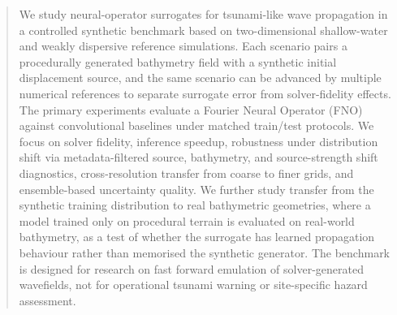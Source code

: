 \begin{abstract}
We study neural-operator surrogates for tsunami-like wave propagation in a controlled synthetic benchmark based on two-dimensional shallow-water and weakly dispersive reference simulations. Each scenario pairs a procedurally generated bathymetry field with a synthetic initial displacement source, and the same scenario can be advanced by multiple numerical references to separate surrogate error from solver-fidelity effects. The primary experiments evaluate a Fourier Neural Operator (FNO) against convolutional baselines under matched train/test protocols. We focus on solver fidelity, inference speedup, robustness under distribution shift via metadata-filtered source, bathymetry, and source-strength shift diagnostics, cross-resolution transfer from coarse to finer grids, and ensemble-based uncertainty quality. We further study transfer from the synthetic training distribution to real bathymetric geometries, where a model trained only on procedural terrain is evaluated on real-world bathymetry, as a test of whether the surrogate has learned propagation behaviour rather than memorised the synthetic generator. The benchmark is designed for research on fast forward emulation of solver-generated wavefields, not for operational tsunami warning or site-specific hazard assessment.
\end{abstract}